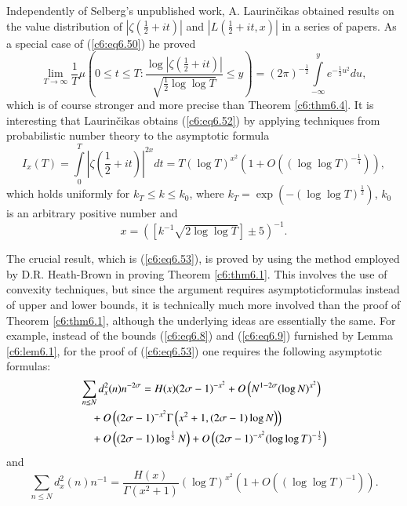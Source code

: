 Independently of Selberg's unpublished work, A. Laurin\v cikas
obtained results on the value distribution of $|\zeta(\frac{1}{2} +
it)|$ and $|L(\frac{1}{2} + it, x)|$ in a series of papers. As a
special case of (\ref{c6:eq6.50}) he proved 
{\fontsize{10pt}{12pt}\selectfont
\begin{equation}
\lim\limits_{T \to \infty} \frac{1}{T} \mu  \left(0 \leq t \leq T :
\frac{\log |\zeta \left(\frac{1}{2} + it \right)|}{\sqrt{\frac{1}{2}
    \log \log T}} \leq y \right) = (2\pi)^{-\frac{1}{2}}
\int\limits^y_{-\infty} e^{-\frac{1}{2} u^2} du,  
\label{c6:eq6.52}
\end{equation}}
which is of course stronger and more precise than Theorem
\ref{c6:thm6.4}. It is interesting that Laurin\v cikas obtains
(\ref{c6:eq6.52}) by applying techniques from probabilistic number
theory to the asymptotic formula 
{\fontsize{10pt}{12pt}\selectfont
\begin{equation}
I_x (T) = \int\limits^T_0 \left|\zeta \left(\frac{1}{2} + it
\right)\right|^{2x} dt = T (\log T)^{x^2} \left(1+O\left((\log \log
T)^{-\frac{1}{4}}\right)\right), \label{c6:eq6.53} 
\end{equation}}
which holds uniformly for $k_T \leq k \leq k_0$, where $k_T = \exp
(-(\log \log T)^{\frac{1}{2}})$, $k_0$ is an arbitrary positive number
and  
\begin{equation}
x = \left(\left[k^{-1} \sqrt{2 \log \log T}\right] \pm
5\right)^{-1}.\label{c6:eq6.54} 
\end{equation}

The crucial result, which is (\ref{c6:eq6.53}), is proved by using the
method employed by D.R. Heath-Brown in proving Theorem
\ref{c6:thm6.1}. This involves the use of convexity techniques, but
since the argument requires asymptotic\pageoriginale formulas instead
of upper and lower bounds, it is technically much more involved than
the proof of Theorem \ref{c6:thm6.1}, although the underlying ideas
are essentially the same. For example, instead of the bounds
(\ref{c6:eq6.8}) and (\ref{c6:eq6.9}) furnished by Lemma
\ref{c6:lem6.1}, for the proof of (\ref{c6:eq6.53}) one requires the
following asymptotic formulas: 
\begin{align}
& \sum\limits_{n \leq N} d^2_x (n) n^{-2\sigma} = H(x) (2\sigma
  -1)^{-x^2} + O \left(N^{1-2\sigma} (\log
  N)^{x^2}\right)\label{c6:eq6.55}\\ 
& \quad + O \left((2\sigma -1)^{-x^2} \Gamma \left(x^2 + 1, (2\sigma -1)
  \log N\right)\right)\notag\\ 
& \quad + O \left((2\sigma -1) \log^{\frac{1}{2}} N\right) + O
  \left((2\sigma -1)^{-x^2} (\log \log T)^{-\frac{1}{2}}\right) \notag
\end{align}
and 
\begin{equation}
\sum\limits_{n \leq N} d^2_x(n) n^{-1} = \frac{H(x)}{\Gamma(x^2 +1)}
(\log T)^{x^2} \left(1+O \left((\log \log
T)^{-1}\right)\right). \label{c6:eq6.56} 
\end{equation}

